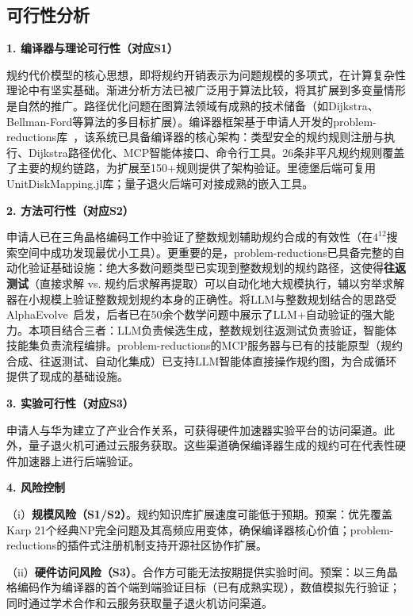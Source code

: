 \subsection*{可行性分析}

\textbf{1. 编译器与理论可行性（对应S1）}

规约代价模型的核心思想，即将规约开销表示为问题规模的多项式，在计算复杂性理论中有坚实基础。渐进分析方法已被广泛用于算法比较，将其扩展到多变量情形是自然的推广。路径优化问题在图算法领域有成熟的技术储备（如Dijkstra、Bellman-Ford等算法的多目标扩展）。编译器框架基于申请人开发的problem-reductions库~\cite{ProblemReductions2025}，该系统已具备编译器的核心架构：类型安全的规约规则注册与执行、Dijkstra路径优化、MCP智能体接口、命令行工具。26条非平凡规约规则覆盖了主要的规约链路，为扩展至150+规则提供了架构验证。里德堡后端可复用UnitDiskMapping.jl库；量子退火后端可对接成熟的嵌入工具。

\textbf{2. 方法可行性（对应S2）}

申请人已在三角晶格编码工作中验证了整数规划辅助规约合成的有效性（在$4^{12}$搜索空间中成功发现最优小工具）。更重要的是，problem-reductions已具备完整的自动化验证基础设施：绝大多数问题类型已实现到整数规划的规约路径，这使得\textbf{往返测试}（直接求解 vs. 规约后求解再提取）可以自动化地大规模执行，辅以穷举求解器在小规模上验证整数规划规约本身的正确性。将LLM与整数规划结合的思路受AlphaEvolve~\cite{AlphaEvolve2025}启发，后者已在50余个数学问题中展示了LLM+自动验证的强大能力。本项目结合三者：LLM负责候选生成，整数规划往返测试负责验证，智能体技能集负责流程编排。problem-reductions的MCP服务器与已有的技能原型（规约合成、往返测试、自动化集成）已支持LLM智能体直接操作规约图，为合成循环提供了现成的基础设施。

\textbf{3. 实验可行性（对应S3）}

申请人与华为建立了产业合作关系，可获得硬件加速器实验平台的访问渠道。此外，量子退火机可通过云服务获取。这些渠道确保编译器生成的规约可在代表性硬件加速器上进行后端验证。

\textbf{4. 风险控制}

（i）\textbf{规模风险（S1/S2）}。规约知识库扩展速度可能低于预期。预案：优先覆盖Karp 21个经典NP完全问题及其高频应用变体，确保编译器核心价值；problem-reductions的插件式注册机制支持开源社区协作扩展。

（ii）\textbf{硬件访问风险（S3）}。合作方可能无法按期提供实验时间。预案：以三角晶格编码作为编译器的首个端到端验证目标（已有成熟实现），数值模拟先行验证；同时通过学术合作和云服务获取量子退火机访问渠道。

